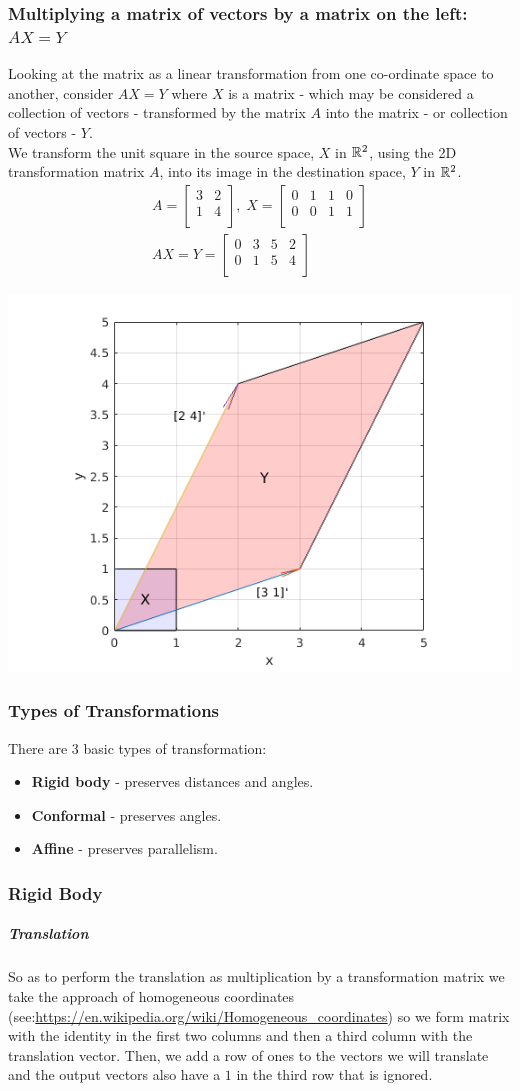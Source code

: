 \documentclass[MathsNotesBase.tex]{subfiles}
\newcommand{\exampleMatrixTwoDTransform}{
We transform the unit square in the source space, $X$ in $\R{2}$, using the 2D transformation matrix $A$, into its image in the destination space, $Y$ in $\R{2}$.
	\begin{align*}
	A =
	\begin{bmatrix}    
	3  &   2 \\
	1  &   4 \\		
	\end{bmatrix}
	,\; X = 
	\begin{bmatrix}  
	0   &  1  &   1  &   0 \\
	0   &  0  &   1  &   1	\\	
	\end{bmatrix} \\[10pt]
	AX = Y = 
	\begin{bmatrix}   
	0  &   3  &   5  &   2 \\
	0  &   1  &   5  &   4	\\
	\end{bmatrix}
	\end{align*}
	
	\begin{center}
	\includegraphics[scale=0.85]{resources/img/GeometryOfMatrices_images/linear_transformation.png}
	\end{center}
}
\begin{document}
{		\subsubsection{Multiplying a matrix of vectors by a matrix on the left: $ AX = Y $}
		Looking at the matrix as a linear transformation from one co-ordinate space to another, consider $AX = Y$ where $X$ is a matrix - which may be considered a collection of vectors - transformed by the matrix $A$ into the matrix - or collection of vectors - $Y$.\\
					
		\exampleMatrixTwoDTransform
		
		\subsubsection{Types of Transformations}
		There are 3 basic types of transformation:
		\begin{itemize}
		\item{\textbf{Rigid body} - preserves distances and angles.
		}
		\item{\textbf{Conformal} - preserves angles.
		}
		\item{\textbf{Affine} - preserves parallelism.
		}
		\end{itemize}
		
		\subsubsection{Rigid Body}
		\subparagraph{Translation}
		So as to perform the translation as multiplication by a transformation matrix we take the approach of homogeneous coordinates (see:\url{https://en.wikipedia.org/wiki/Homogeneous_coordinates}) so we form matrix with the identity in the first two columns and then a third column with the translation vector. Then, we add a row of ones to the vectors we will translate and the output vectors also have a $1$ in the third row that is ignored.
		
}
\end{document}
